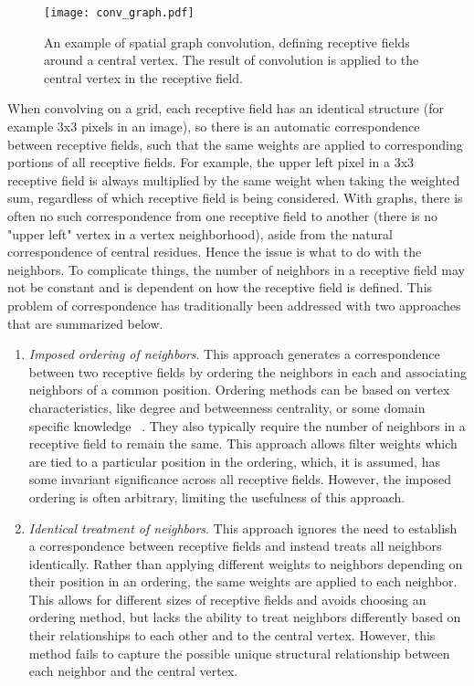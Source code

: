 \begin{figure}
	\centering
	\texttt{[image: conv\_graph.pdf]}
	\caption{An example of spatial graph convolution, defining receptive fields around a central vertex. The result of convolution is applied to the central vertex in the receptive field.}
	\label{fig:spatial_graph_conv}
\end{figure}

When convolving on a grid, each receptive field has an identical structure (for example 3x3 pixels in an image), so there is an automatic correspondence between receptive fields, such  that the same weights are applied to corresponding portions of all receptive fields. 
For example, the upper left pixel in a 3x3 receptive field is always multiplied by the same weight when taking the weighted sum, regardless of which receptive field is being considered.
With graphs, there is often no such correspondence from one receptive field to another (there is no "upper left" vertex in a vertex neighborhood), aside from the natural correspondence of central residues. Hence the issue is what to do with the neighbors. To complicate things, the number of neighbors in a receptive field may not be constant and is dependent on how the receptive field is defined.
This problem of correspondence has traditionally been addressed with two approaches that are summarized below. 
\begin{enumerate}
	\item \textit{Imposed ordering of neighbors}. This approach generates a correspondence between two receptive fields by ordering the neighbors in each and associating neighbors of a common position. 
	Ordering methods can be based on vertex characteristics, like degree and betweenness centrality, or some domain specific knowledge ~\cite{niepert2016, duvenaud2015}.
	They also typically require the number of neighbors in a receptive field to remain the same.
	This approach allows filter weights which are tied to a particular position in the ordering, which, it is assumed, has some invariant significance across all receptive fields.
	However, the imposed ordering is often arbitrary, limiting the usefulness of this approach.
	
	\item \textit{Identical treatment of neighbors}. This approach ignores the need to establish a correspondence between receptive fields and instead treats all neighbors identically.
	Rather than applying different weights to neighbors depending on their position in an ordering, the same weights are applied to each neighbor.
	This allows for different sizes of receptive fields and avoids choosing an ordering method, but lacks the ability to treat neighbors differently based on their relationships to each other and to the central vertex.
	However, this method fails to capture the possible unique structural relationship between each neighbor and the central vertex.
\end{enumerate}

